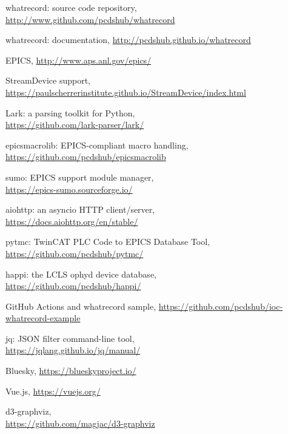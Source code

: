 \documentclass[letter,
               keeplastbox,   %
               ]{jacow}
\begin{document}
%
	{\printbibliography}%
	{%
	
	\begin{thebibliography}{99} %
	
    	whatrecord: source code repository,\\
		\url{http://www.github.com/pcdshub/whatrecord}
	
    	whatrecord: documentation,
		\url{http://pcdshub.github.io/whatrecord}
	
		EPICS,
		\url{http://www.aps.anl.gov/epics/}
	
		StreamDevice support,\\
		\url{https://paulscherrerinstitute.github.io/StreamDevice/index.html}
	
		Lark: a parsing toolkit for Python,\\
		\url{https://github.com/lark-parser/lark/}
	
    	epicsmacrolib: EPICS-compliant macro handling,\\
		\url{https://github.com/pcdshub/epicsmacrolib}
	
		sumo: EPICS support module manager,\\
		\url{https://epics-sumo.sourceforge.io/}
	
		aiohttp: an asyncio HTTP client/server,\\
		\url{https://docs.aiohttp.org/en/stable/}
	
   		pytmc: TwinCAT PLC Code to EPICS Database Tool,\\
		\url{https://github.com/pcdshub/pytmc/}

    happi: the LCLS ophyd device database,\\
    \url{https://github.com/pcdshub/happi/}

		GitHub Actions and whatrecord sample,
		\url{https://github.com/pcdshub/ioc-whatrecord-example}
	
		jq: JSON filter command-line tool,\\
		\url{https://jqlang.github.io/jq/manual/}
	
    Bluesky,
		\url{https://blueskyproject.io/}
	
    Vue.js,
		\url{https://vuejs.org/}
	
    d3-graphviz,\\
		\url{https://github.com/magjac/d3-graphviz}
	
	\end{thebibliography}
} %

%
% 

\end{document}
